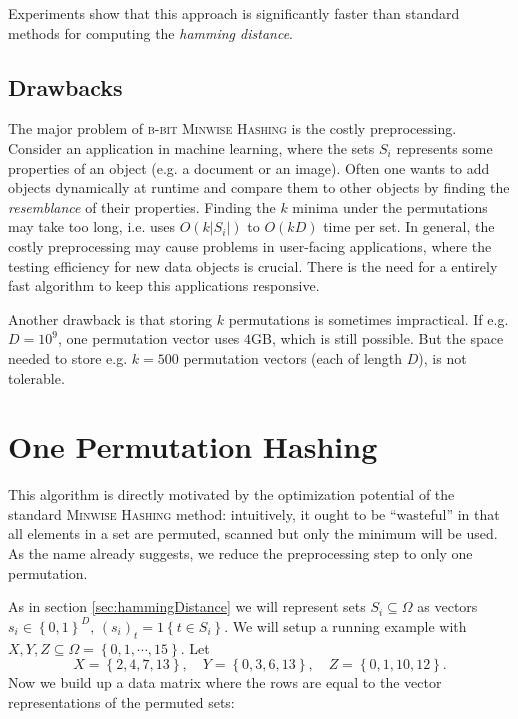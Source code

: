 \documentclass[a4paper]{article}
\begin{document}
Experiments show that this approach is significantly faster than standard methods for computing the \emph{hamming distance}.

\subsection{Drawbacks} \label{sec:b-bitDrawbacks}

The major problem of \textsc{b-bit Minwise Hashing} is the costly preprocessing. Consider an application in machine learning, where the sets $S_i$ represents some properties of an object (e.g. a document or an image). Often one wants to add objects dynamically at runtime and compare them to other objects by finding the \emph{resemblance} of their properties. Finding the $k$ minima under the permutations may take too long, i.e. uses $O(k|S_i|)$ to $O(kD)$ time per set.
In general, the costly preprocessing may cause problems in user-facing applications, where the testing efficiency for new data objects is crucial. There is the need for a entirely fast algorithm to keep this applications responsive.

Another drawback is that storing $k$ permutations is sometimes impractical. If e.g. $D=10^9$, one permutation vector uses $4$GB, which is still possible. But the space needed to store e.g. $k=500$ permutation vectors (each of length $D$), is not tolerable.



\section{One Permutation Hashing}

This algorithm is directly motivated by the optimization potential of the standard \textsc{Minwise Hashing} method: intuitively, it ought to be ``wasteful'' in that all elements in a set are permuted, scanned but only the minimum will be used. As the name already suggests, we reduce the preprocessing step to only one permutation.

As in section \vref{sec:hammingDistance} we will represent sets $S_i \subseteq \Omega$ as vectors $s_i \in \left\lbrace 0,1 \right\rbrace ^D, \, (s_i)_t = 1\left\lbrace t \in S_i \right\rbrace$. We will setup a running example with $X,Y,Z \subseteq \Omega = \left\lbrace 0,1,\cdots,15\right\rbrace$. Let
\[
X=\left\lbrace 2,4,7,13\right\rbrace, \quad Y=\left\lbrace 0,3,6,13\right\rbrace,\quad Z= \left\lbrace 0,1,10,12\right\rbrace.
\]
Now we build up a data matrix where the rows are equal to the vector representations of the permuted sets:
\end{document}

